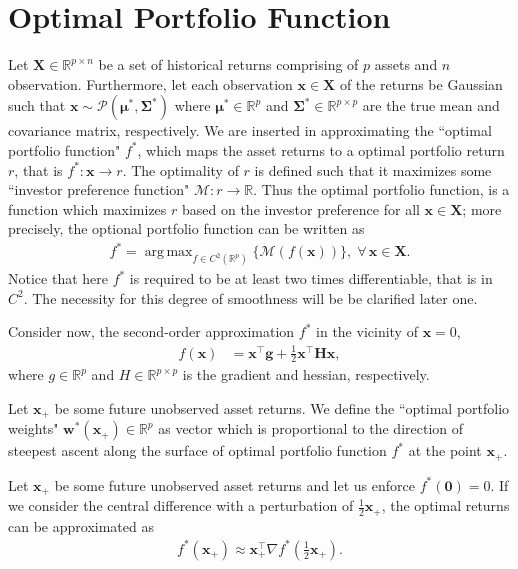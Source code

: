 \documentclass[]{usiinfdocprop}
\DeclareMathOperator*{\argmax}{arg\,max}
\newcommand{\bb}[1]{\boldsymbol{\mathbf{#1}}}
\begin{document}
\section{Optimal Portfolio Function}
Let $\bb{X} \in \mathbb{R}^{p \times n} $ be a set of historical returns comprising of $p$ assets and $n$ observation. Furthermore, let each observation $\bb{x} \in \bb{X}$ of the returns be Gaussian such that  $\bb{x} \sim \mathcal{P}(\bb{\mu^*},\bb{\Sigma^*})$ where $\bb{\mu^*} \in \mathbb{R}^p$ and $\bb{\Sigma^*} \in \mathbb{R}^{p \times p}$ are the true mean and covariance matrix, respectively. We are inserted in approximating the ``optimal portfolio function" $f^*$, which maps the asset returns to a optimal portfolio return $r$, that is $f^*:\bb{x} \to r$. The optimality of $r$ is defined such that it maximizes some ``investor preference function" $\mathcal{M}:r \to \mathbb{R}$. Thus the optimal portfolio function, is a function which maximizes $r$ based on the investor preference for all $ \bb{x} \in \bb{X}$; more precisely, the optional portfolio function can be written as   
\begin{align}
    f^* = \argmax_{f \in C^2(\mathbb{R}^p) } \{ \mathcal{M} (f(\bb{x}))\}, \; \forall \, \bb{x} \in \bb{X}. 
\end{align}
Notice that here $f^*$ is required to be at least two times differentiable, that is in $C^2$. The necessity for this degree of smoothness will be be clarified later one. 

Consider now, the second-order approximation $f^*$ in the vicinity of $\bb{x}=0$,
\begin{align}
    f(\bb{x}) &= \bb{x}^\top \bb{g} + \frac{1}{2} \bb{x}^\top \bb{H} \bb{x},
\end{align}
where $g \in \mathbb{R}^p$ and $H \in \mathbb{R}^{p \times p}$ is the gradient and hessian, respectively.

Let $\bb{x}_+$ be some future unobserved asset returns. We define the ``optimal portfolio weights" $\bb{w}^* (\bb{x}_+) \in \mathbb{R}^p$ as vector which is proportional to the direction of steepest ascent along the surface of optimal portfolio function $f^*$ at the point $\bb{x}_+$.



Let $\bb{x}_+$ be some future unobserved asset returns and let us enforce $f^*(\bb{0})=0$. If we consider the central difference with a perturbation of $\frac{1}{2} \bb{x}_+$, the optimal returns can be approximated as  
\begin{align}
    f^*(\bb{x}_+) \approx  \bb{x}_+^\top \nabla f^*(\frac{1}{2}\bb{x}_+).
\end{align}
\end{document}
